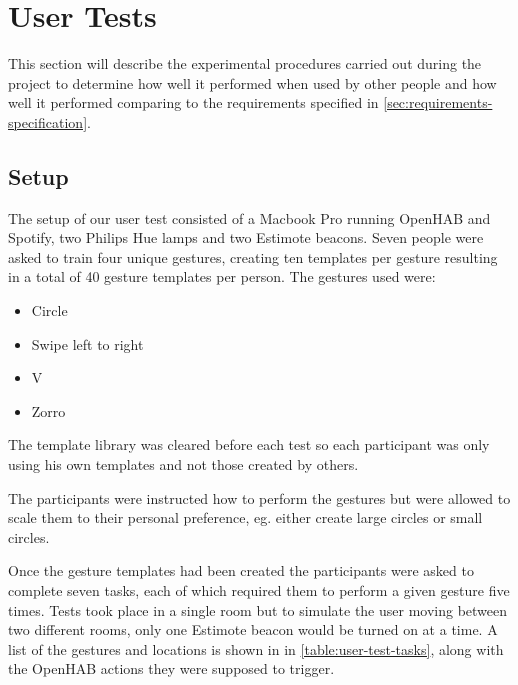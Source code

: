 \section{User Tests}
\label{sec:evaluation:user-tests}

This section will describe the experimental procedures carried out during the project to determine how well it performed when used by
other people and how well it performed comparing to the requirements specified in \cref{sec:requirements-specification}.

\subsection{Setup}
\label{sec:evaluation:user-tests-setup}

The setup of our user test consisted of a Macbook Pro running OpenHAB and Spotify, two Philips Hue lamps and two Estimote beacons.
Seven people were asked to train four unique gestures, creating ten templates per gesture resulting in a total of 40 gesture templates
per person.
The gestures used were:

\begin{itemize}
  \item Circle
  \item Swipe left to right
  \item V
  \item Zorro
\end{itemize}

The template library was cleared before each test so each participant was only using his own templates and not those created by others.

The participants were instructed how to perform the gestures but were allowed to scale them to their personal preference, eg.
either create large circles or small circles.

Once the gesture templates had been created the participants were asked to complete seven tasks, each of which required them to perform a given gesture five times.
Tests took place in a single room but to simulate the user moving between two different rooms, only one Estimote beacon would be turned on at a time.
A list of the gestures and locations is shown in in \cref{table:user-test-tasks}, along with the OpenHAB actions they were supposed to trigger.

